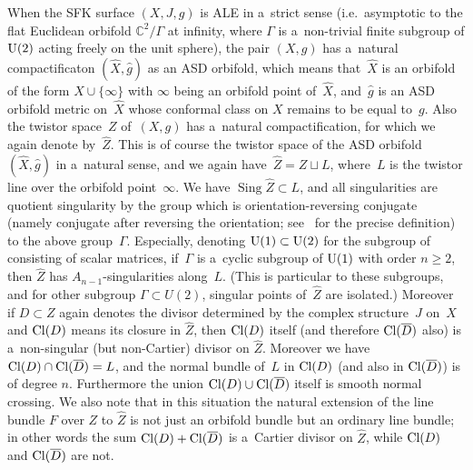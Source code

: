 \documentclass[pdftex]{sigma}
\numberwithin{equation}{section}
\DeclareMathOperator{\Sing}{Sing}
\begin{document}
When the SFK surface $(X,J,g)$ is ALE in a~strict sense (i.e.\ asymptotic to the f\/lat Euclidean orbifold
$\mathbb{C}^2/\Gamma$ at inf\/inity, where $\Gamma$ is a~non-trivial f\/inite subgroup of ${\rm{U}}(2)$ acting freely on
the unit sphere), the pair $(X,g)$ has a~natural compactif\/icaton $(\hat X, \hat g)$ as an ASD orbifold, which means
that~$\hat X$ is an orbifold of the form $X\cup\{\infty\}$ with $\infty$ being an orbifold point of~$\hat X$, and~$\hat
g$ is an ASD orbifold metric on~$\hat X$ whose conformal class on $X$ remains to be equal to~$g$.
Also the twistor space~$Z$ of~$(X,g)$ has a~natural compactif\/ication, for which we again denote by~$\hat Z$.
This is of course the twistor space of the ASD orbifold~$(\hat X,\hat g)$ in a~natural sense, and we again have~$\hat Z
= Z\sqcup L$, where~$L$ is the twistor line over the orbifold point~$\infty$.
We have $\Sing\hat Z\subset L$, and all singularities are quotient singularity by the group which is
orientation-reversing conjugate (namely conjugate after reversing the orientation; see~\cite[Def\/inition~1.4]{V} for the precise
def\/inition) to the above group~$\Gamma$.
Especially, denoting ${\rm{U}}(1)\subset{\rm{U}}(2)$ for the subgroup of consisting of scalar matrices, if~$\Gamma$ is
a~cyclic subgroup of ${\rm{U}}(1)$ with order $n\ge 2$, then $\hat Z$ has $A_{n-1}$-singularities along~$L$.
(This is particular to these subgroups, and for other subgroup $\Gamma\subset U(2)$, singular points of~$\hat Z$ are
isolated.) Moreover if $D\subset Z$ again denotes the divisor determined by the complex structure~$J$ on~$X$ and
${\rm{Cl}}(D)$ means its closure in $\hat Z$, then ${\rm{Cl}}(D)$ itself (and therefore ${\rm{Cl}}(\overline D)$ also)
is a~non-singular (but non-Cartier) divisor on $\hat Z$.
Moreover we have ${\rm{Cl}}(D)\cap {\rm{Cl}}(\overline D)=L$, and the normal bundle of~$L$ in ${\rm{Cl}}(D)$ (and also
in ${\rm{Cl}}(\overline D)$) is of degree $n$.
Furthermore the union ${\rm{Cl}}(D) \cup {\rm{Cl}}(\overline D)$ itself is smooth normal crossing.
We also note that in this situation the natural extension of the line bundle $F$ over $Z$ to $\hat Z$ is not just an
orbifold bundle but an ordinary line bundle; in other words the sum ${\rm{Cl}}(D) + {\rm{Cl}}(\overline D)$ is a~Cartier
divisor on $\hat Z$, while ${\rm{Cl}}(D)$ and ${\rm{Cl}}(\overline D)$ are not.
\end{document}
